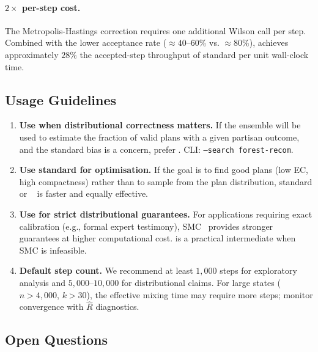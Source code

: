 \paragraph{$2\times$ per-step cost.}
The Metropolis-Hastings correction requires one additional Wilson \ust{} call
per step.
Combined with the lower acceptance rate ($\approx\!40$--$60\%$ vs.
$\approx\!80\%$), \fr{} achieves approximately $28\%$ the accepted-step
throughput of standard \recom{} per unit wall-clock time.

\subsection{Usage Guidelines}

\begin{enumerate}
  \item \textbf{Use \fr{} when distributional correctness matters.}
        If the ensemble will be used to estimate the fraction of valid plans
        with a given partisan outcome, and the standard \recom{} bias is a
        concern, prefer \fr{}.
        CLI: \texttt{--search forest-recom}.

  \item \textbf{Use standard \recom{} for optimisation.}
        If the goal is to find good plans (low EC, high compactness) rather
        than to sample from the plan distribution, standard \recom{} or
        \sburst{}~\citep{dellaLibera2026shortburst} is faster and equally
        effective.

  \item \textbf{Use \smc{} for strict distributional guarantees.}
        For applications requiring exact calibration (e.g., formal expert
        testimony), SMC~\citep{dellaLibera2026smc} provides stronger guarantees
        at higher computational cost.
        \fr{} is a practical intermediate when SMC is infeasible.

  \item \textbf{Default step count.}
        We recommend at least $1{,}000$ steps for exploratory analysis and
        $5{,}000$--$10{,}000$ for distributional claims.
        For large states ($n > 4{,}000$, $k > 30$), the effective mixing time
        may require more steps; monitor convergence with $\hat{R}$ diagnostics.
\end{enumerate}

\subsection{Open Questions}

